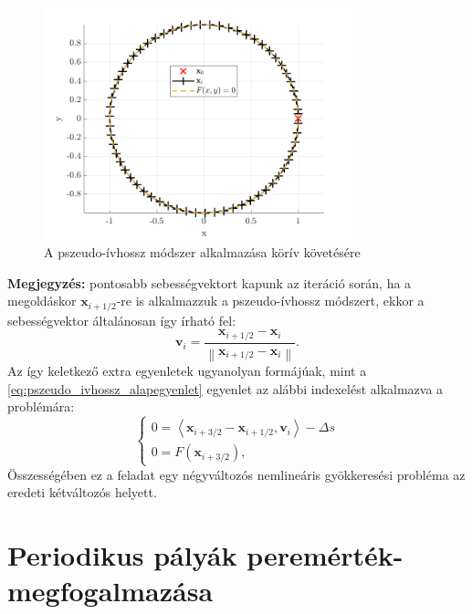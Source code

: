 \begin{figure}[ht]
	\centering
	\includegraphics[width=0.8\textwidth]{graphics/pszeudo_ivhossz_koriv}
	\caption{A pszeudo-ívhossz módszer alkalmazása körív követésére}\label{fig:pszeudo_ivhossz_koriv}
\end{figure}

\textbf{Megjegyzés:} pontosabb sebességvektort kapunk az iteráció során, ha a megoldáskor $\mathbf{x}_{i+1/2}$-re is alkalmazzuk a pszeudo-ívhossz módszert, ekkor a sebességvektor általánosan így írható fel:
\begin{equation}
\mathbf{v}_i = \frac{\mathbf{x}_{i+1/2} - \mathbf{x}_{i}}{\left \| \mathbf{x}_{i+1/2} - \mathbf{x}_{i} \right \|}.
\end{equation}
Az így keletkező extra egyenletek ugyanolyan formájúak, mint a \eqref{eq:pszeudo_ivhossz_alapegyenlet} egyenlet az alábbi indexelést alkalmazva a problémára:
\begin{equation}
\begin{cases}
0 = \left< \mathbf{x}_{i+3/2} - \mathbf{x}_{i+1/2}, \mathbf{v}_i \right> - \Delta s \\
0 = F(\mathbf{x}_{i+3/2}),
\end{cases}
\end{equation}
Összességében ez a feladat egy négyváltozós nemlineáris gyökkeresési probléma az eredeti kétváltozós helyett.

\section{Periodikus pályák peremérték-megfogalmazása}
\label{sec:per_palya_perem_megfog}

